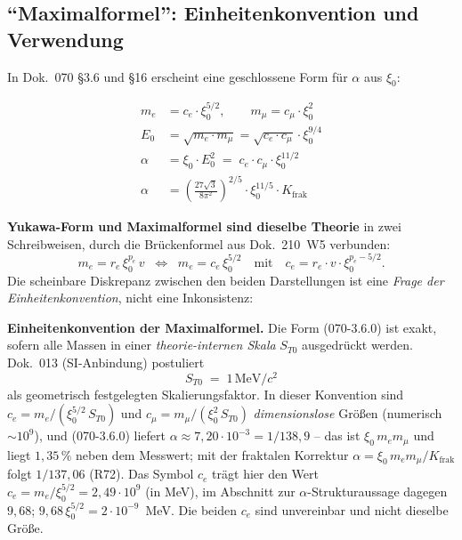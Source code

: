 \subsection{\enquote{Maximalformel}: Einheitenkonvention und Verwendung}
\label{subsec:warnung-maximalformel}

In Dok.~070 §3.6 und §16 erscheint eine geschlossene Form für $\alpha$
aus $\xi_0$:

\begin{align}
  m_e &= c_e \cdot \xi_0^{5/2}, \qquad m_\mu = c_\mu \cdot \xi_0^{2}
  \tag*{(070-4.2)}\\
  E_0 &= \sqrt{m_e \cdot m_\mu} = \sqrt{c_e \cdot c_\mu}\cdot \xi_0^{9/4}
  \tag*{(070-3)}\\
  \alpha &= \xi_0 \cdot E_0^2 \;=\; c_e \cdot c_\mu \cdot \xi_0^{11/2}
  \tag*{(070-3.6.0)}\\
  \alpha &= \left(\frac{27\sqrt{3}}{8\pi^2}\right)^{2/5}
           \cdot \xi_0^{11/5} \cdot K_{\text{frak}}
  \tag*{(070-3.6.1)}
\end{align}

\textbf{Yukawa-Form und Maximalformel sind dieselbe Theorie} in zwei
Schreibweisen, durch die Brückenformel aus Dok.~210~W5 verbunden:
\[
  m_e = r_e\,\xi_0^{p_e}\,v
  \;\;\Longleftrightarrow\;\;
  m_e = c_e\,\xi_0^{5/2}
  \quad\text{mit}\quad
  c_e = r_e \cdot v \cdot \xi_0^{p_e - 5/2}.
\]
Die scheinbare Diskrepanz zwischen den beiden Darstellungen ist eine
\emph{Frage der Einheitenkonvention}, nicht eine Inkonsistenz:

\textbf{Einheitenkonvention der Maximalformel.}
Die Form (070-3.6.0) ist exakt, sofern alle Massen in einer
\emph{theorie-internen Skala} $S_{T0}$ ausgedrückt werden. Dok.~013
(SI-Anbindung) postuliert
\begin{equation}
  S_{T0} \;=\; 1\,\text{MeV}/c^2
\end{equation}
als geometrisch festgelegten Skalierungsfaktor. In dieser Konvention
sind $c_e = m_e/(\xi_0^{5/2}\,S_{T0})$ und
$c_\mu = m_\mu/(\xi_0^{2}\,S_{T0})$ \emph{dimensionslose} Größen
(numerisch $\sim 10^9$), und (070-3.6.0) liefert
$\alpha \approx 7{,}20\cdot 10^{-3} = 1/138{,}9$ -- das ist $\xi_0\,m_e m_\mu$ und liegt $1{,}35\,\%$ neben dem Messwert; mit der fraktalen Korrektur $\alpha = \xi_0\,m_e m_\mu/K_{\text{frak}}$ folgt $1/137{,}06$ (R72). Das Symbol $c_e$ trägt hier den Wert $c_e = m_e/\xi_0^{5/2} = 2{,}49 \cdot 10^{9}$ (in MeV), im Abschnitt zur $\alpha$-Strukturaussage dagegen $9{,}68$; $9{,}68\,\xi_0^{5/2} = 2 \cdot 10^{-9}$~MeV. Die beiden $c_e$ sind unvereinbar und nicht dieselbe Größe.

